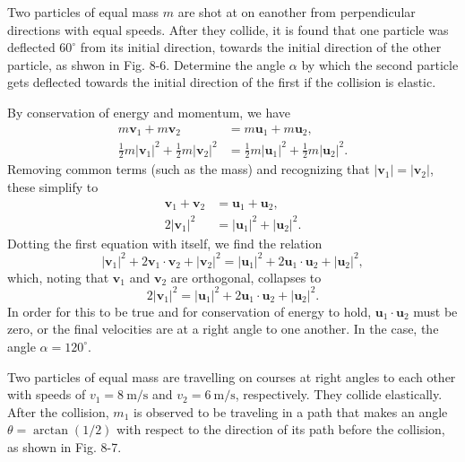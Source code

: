 \documentclass[../feynman-lectures-on-physics.tex]{subfiles}
\begin{document}
\begin{questions}
\question Two particles of equal mass $m$ are shot at on eanother from
  perpendicular directions with equal speeds. After they collide, it is found
  that one particle was deflected $60^\circ$ from its initial direction,
  towards the initial direction of the other particle, as shwon in Fig. 8-6.
  Determine the angle $\alpha$ by which the second particle gets deflected
  towards the initial direction of the first if the collision is elastic.

  \begin{solution}
    By conservation of energy and momentum, we have
    \begin{align*}
      m\mathbf{v}_1 + m\mathbf{v}_2 &= m\mathbf{u}_1 + m\mathbf{u}_2, \\
      \frac{1}{2}m|\mathbf{v}_1|^2 + \frac{1}{2}m|\mathbf{v}_2|^2 &= \frac{1}{2}m|\mathbf{u}_1|^2 + \frac{1}{2}m|\mathbf{u}_2|^2.
    \end{align*}
    Removing common terms (such as the mass) and recognizing that
    $|\mathbf{v}_1| = |\mathbf{v}_2|$, these simplify to
    \begin{align*}
      \mathbf{v}_1 + \mathbf{v}_2 &= \mathbf{u}_1 + \mathbf{u}_2, \\
      2|\mathbf{v}_1|^2 &= |\mathbf{u}_1|^2 + |\mathbf{u}_2|^2.
    \end{align*}
    Dotting the first equation with itself, we find the relation
    \[
      |\mathbf{v}_1|^2 + 2\mathbf{v}_1\cdot\mathbf{v}_2 + |\mathbf{v}_2|^2 = |\mathbf{u}_1|^2 + 2\mathbf{u}_1\cdot\mathbf{u}_2 + |\mathbf{u}_2|^2,
    \]
    which, noting that $\mathbf{v}_1$ and $\mathbf{v}_2$ are orthogonal,
    collapses to
    \[
      2|\mathbf{v}_1|^2 = |\mathbf{u}_1|^2 + 2\mathbf{u}_1\cdot\mathbf{u}_2 + |\mathbf{u}_2|^2.
    \]
    In order for this to be true and for conservation of energy to hold,
    $\mathbf{u}_1\cdot\mathbf{u}_2$ must be zero, or the final velocities are at
    a right angle to one another. In the case, the angle $\alpha = 120^\circ$.
  \end{solution}

\question Two particles of equal mass are travelling on courses at right
  angles to each other with speeds of $v_1 = \SI{8}{\meter\per\second}$ and
  $v_2 = \SI{6}{\meter\per\second}$, respectively. They collide elastically.
  After the collision, $m_1$ is observed to be traveling in a path that
  makes an angle $\theta = \arctan(1/2)$ with respect to the direction of
  its path before the collision, as shown in Fig. 8-7.
  \begin{parts}

\end{parts}
\end{questions}
\end{document}

